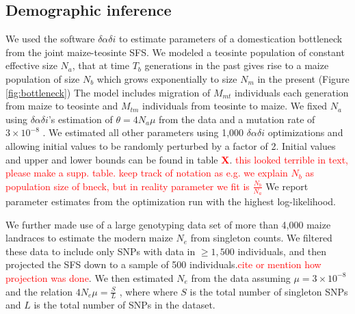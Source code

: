 \documentclass{pnastwo}
\newcommand{\jri}[1]{\textcolor{red}{\scriptsize #1}}
\newcommand{\X}{\textcolor{red}{\bf X}}
\begin{document}
\begin{article}
\begin{materials}
\subsection{Demographic inference}
We used the software $\delta\alpha\delta{i}$ \cite{gutenkunst2009} to estimate parameters of a domestication bottleneck from the joint maize-teosinte SFS.
We modeled a teosinte population of constant effective size $N_a$, that at time $T_b$ generations in the past gives rise to a maize population of size $N_b$ which grows exponentially to size $N_m$ in the present (Figure \ref{fig:bottleneck})
The model includes migration of $M_{mt}$ individuals each generation from maize to teosinte and $M_{tm}$ individuals from teosinte to maize.  
We fixed $N_a$ using $\delta\alpha\delta{i}$'s estimation of $\theta=4N_a\mu$ from the data and a mutation rate of $3 \times 10^{-8}$ \cite{clark2005}. 
We estimated all other parameters using 1,000 $\delta\alpha\delta{i}$ optimizations and allowing initial values to be randomly perturbed by a factor of 2.  
Initial values and upper and lower bounds can be found in table \X. \jri{this looked terrible in text, please make a supp. table.  keep track of notation as e.g. we explain $N_b$ as population size of bneck, but in reality parameter we fit is $\frac{N_b}{N_a}$}
We report parameter estimates from the optimization run with the highest log-likelihood.

We further made use of a large genotyping data set of more than 4,000 maize landraces \cite{Hearne2015} to estimate the modern maize $N_e$ from singleton counts.
We filtered these data to include only SNPs with data in $\geq 1,500$ individuals, and then projected the SFS down to a sample of 500 individuals.\jri{cite or mention how projection was done}. 
We then estimated $N_e$ from the data assuming $\mu = 3 \times 10^{-8}$ \cite{clark2005} and the relation  $4N_e\mu = \frac{S}{L}$ \cite{fu1993}, where where $S$ is the total number of singleton SNPs and $L$ is the total number of SNPs in the dataset.


\end{materials}
\end{article}
\end{document}
